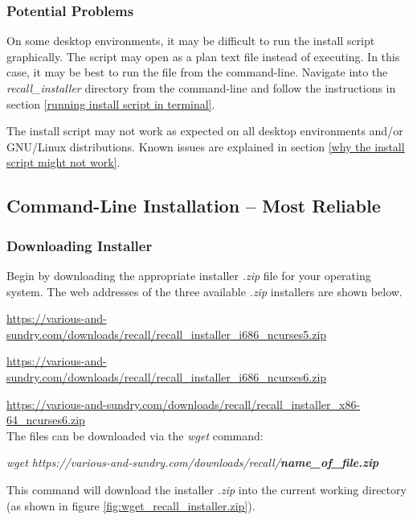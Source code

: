 \documentclass[letterpaper]{article}
\begin{document}
\subsubsection{Potential Problems}
On some desktop environments, it may be difficult to run the install script graphically. The script may open as a plan text file instead of executing. In this case, it may be best to run the file from the command-line. Navigate into the \textit{recall\_installer} directory from the command-line and follow the instructions in section \ref{running install script in terminal}.

The install script may not work as expected on all desktop environments and/or GNU/Linux distributions. Known issues are explained in section \ref{why the install script might not work}.

\subsection{Command-Line Installation -- Most Reliable} \label{command_line_install}
\subsubsection{Downloading Installer} \label{running the install script in a terminal}
Begin by downloading the appropriate installer \textit{.zip} file for your operating system. The web addresses of the three available \textit{.zip} installers are shown below.

\href{https://various-and-sundry.com/downloads/recall/recall_installer_i686_ncurses5.zip}{https://various-and-sundry.com/downloads/recall/recall\_installer\_i686\_ncurses5.zip}

\href{https://various-and-sundry.com/downloads/recall/recall_installer_i686_ncurses6.zip}{https://various-and-sundry.com/downloads/recall/recall\_installer\_i686\_ncurses6.zip}

\href{https://various-and-sundry.com/downloads/recall/recall_installer_x86-64_ncurses6.zip}{https://various-and-sundry.com/downloads/recall/recall\_installer\_x86-64\_ncurses6.zip}\\

The files can be downloaded via the \textit{wget} command:

\textit{wget https://various-and-sundry.com/downloads/recall/\textbf{name\_of\_file.zip}}

This command will download the installer \textit{.zip} into the current working directory (as shown in figure \ref{fig:wget_recall_installer.zip}).
\end{document}
